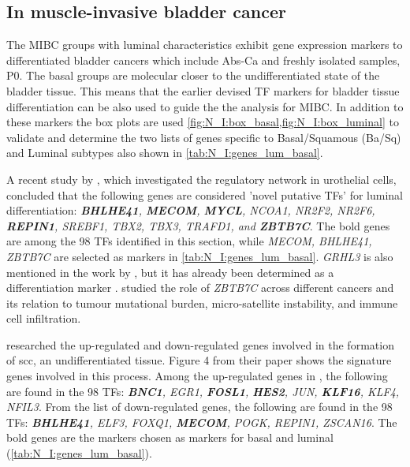 \newpage


\subsection{In muscle-invasive bladder cancer} \label{s:N_I:sel_tfs_cancer}


The MIBC groups with luminal characteristics exhibit gene expression markers to differentiated bladder cancers which include Abs-Ca and freshly isolated samples, P0. The basal groups are molecular closer to the undifferentiated state of the bladder tissue. This means that the earlier devised TF markers for bladder tissue differentiation can be also used to guide the the analysis for MIBC. In addition to these markers the box plots are used \cref{fig:N_I:box_basal,fig:N_I:box_luminal} to validate and determine the two lists of genes specific to Basal/Squamous (Ba/Sq) and Luminal subtypes  also shown in \cref{tab:N_I:genes_lum_basal}. 

A recent study by \citet{Ramal2024-ha}, which investigated the regulatory network in urothelial cells, concluded that the following genes are considered 'novel putative TFs' for luminal differentiation: \textit{\textbf{BHLHE41}, \textbf{MECOM}, \textbf{MYCL}, NCOA1, NR2F2, NR2F6, \textbf{REPIN1}, SREBF1, TBX2, TBX3, TRAFD1, and \textbf{ZBTB7C}}. The bold genes are among the 98 TFs identified in this section, while \textit{MECOM, BHLHE41, ZBTB7C} are selected as markers in \cref{tab:N_I:genes_lum_basal}. \textit{GRHL3} is also mentioned in the work by \citet{Ramal2024-ha}, but it has already been determined as a differentiation marker \citet{Bock2014-zy}. \citet{Chen2021-tc} studied the role of \textit{ZBTB7C} across different cancers and its relation to tumour mutational burden, micro-satellite instability, and immune cell infiltration.

\citet{Hurst2022-sp} researched the up-regulated and down-regulated genes involved in the formation of \acrfull{scc}, an undifferentiated tissue. Figure 4 from their paper shows the signature genes involved in this process. Among the up-regulated genes in \citet{Hurst2022-sp}, the following are found in the 98 TFs: \textit{\textbf{BNC1}, EGR1, \textbf{FOSL1}, \textbf{HES2}, JUN, \textbf{KLF16}, KLF4, NFIL3}. From the list of down-regulated genes, the following are found in the 98 TFs: \textit{\textbf{BHLHE41}, ELF3, FOXQ1, \textbf{MECOM}, POGK, REPIN1, ZSCAN16}. The bold genes are the markers chosen as markers for basal and luminal (\cref{tab:N_I:genes_lum_basal}).


